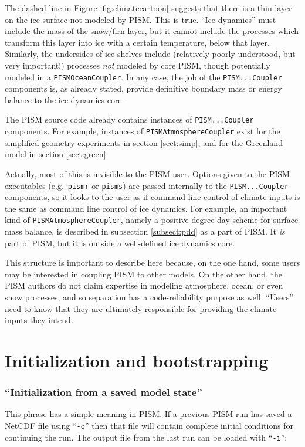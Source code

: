 \documentclass[11pt,final]{amsart}
\renewcommand{\t}[1]{\texttt{#1}}
\newcommand{\pismoptionindex}[1]{\index{options for PISM (and PETSc)!\texttt{-#1}}}
\newcommand{\intextoption}[1]{\texttt{-#1}\pismoptionindex{#1}}
\begin{document}
The dashed line in Figure \ref{fig:climatecartoon} suggests that there is a thin layer on the ice surface not modeled by PISM.  This is true.  ``Ice dynamics'' must include the mass of the snow/firn layer, but it cannot include the processes which transform this layer into ice with a certain temperature, below that layer.  Similarly, the undersides of ice shelves include (relatively poorly-understood, but very important!) processes \emph{not} modeled by core PISM, though potentially modeled in a \t{PISMOceanCoupler}.  In any case, the job of the \t{PISM...Coupler} components is, as already stated, provide definitive boundary mass or energy balance to the ice dynamics core.

The PISM source code already contains instances of \t{PISM...Coupler} components.  For example, instances of \t{PISMAtmosphereCoupler} exist for the simplified geometry experiments in section \ref{sect:simp}, and for the Greenland model in section \ref{sect:green}.

Actually, most of this is invisible to the PISM user.  Options given to the PISM executables (e.g.~\t{pismr} or \t{pisms}) are passed internally to the \t{PISM...Coupler} components, so it looks to the user as if command line control of climate inputs is the same as command line control of ice dynamics.  For example, an important kind of \t{PISMAtmosphereCoupler}, namely a positive degree day scheme for surface mass balance, is described in subsection \ref{subsect:pdd} as a part of PISM.  It \emph{is} part of PISM, but it is outside a well-defined ice dynamics core.

This structure is important to describe here because, on the one hand, some users may be interested in coupling PISM to other models.  On the other hand, the PISM authors do not claim expertise in modeling atmosphere, ocean, or even snow processes, and so separation has a code-reliability purpose as well.  ``Users'' need to know that they are ultimately responsible for providing the climate inputs they intend.


\clearpage
\newpage
\section{Initialization and bootstrapping}\label{sect:boot}  

\subsubsection*{``Initialization from a saved model state''}  This phrase has a simple meaning in PISM.  If a previous PISM run has saved a NetCDF file using ``\verb|-o|'' then that file will contain complete initial conditions for continuing the run.  The output file from the last run can be loaded with ``\intextoption{i}'':
\end{document}

